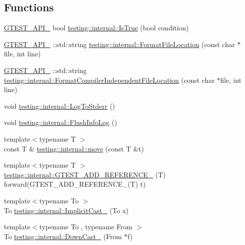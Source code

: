 \subsection*{Functions}
\begin{DoxyCompactItemize}
\item 
\mbox{\hyperlink{gtest-port_8h_aa73be6f0ba4a7456180a94904ce17790}{G\+T\+E\+S\+T\+\_\+\+A\+P\+I\+\_\+}} bool \mbox{\hyperlink{namespacetesting_1_1internal_a527b9bcc13669b9a16400c8514266254}{testing\+::internal\+::\+Is\+True}} (bool condition)
\item 
\mbox{\hyperlink{gtest-port_8h_aa73be6f0ba4a7456180a94904ce17790}{G\+T\+E\+S\+T\+\_\+\+A\+P\+I\+\_\+}} \+::std\+::string \mbox{\hyperlink{namespacetesting_1_1internal_a31b7c3abed4a7c395f42c61e993989f4}{testing\+::internal\+::\+Format\+File\+Location}} (const char $\ast$file, int line)
\item 
\mbox{\hyperlink{gtest-port_8h_aa73be6f0ba4a7456180a94904ce17790}{G\+T\+E\+S\+T\+\_\+\+A\+P\+I\+\_\+}} \+::std\+::string \mbox{\hyperlink{namespacetesting_1_1internal_a1ee4cde97868c53e442d3182496a9f3c}{testing\+::internal\+::\+Format\+Compiler\+Independent\+File\+Location}} (const char $\ast$file, int line)
\item 
void \mbox{\hyperlink{namespacetesting_1_1internal_a06b1b20029fbd1dbeb59752f914fab84}{testing\+::internal\+::\+Log\+To\+Stderr}} ()
\item 
void \mbox{\hyperlink{namespacetesting_1_1internal_a2135f223bf6b527729aeaa651115183b}{testing\+::internal\+::\+Flush\+Info\+Log}} ()
\item 
{\footnotesize template$<$typename T $>$ }\\const T \& \mbox{\hyperlink{namespacetesting_1_1internal_a0f6d06bf8c3093b9c22bb08723db201e}{testing\+::internal\+::move}} (const T \&t)
\item 
{\footnotesize template$<$typename T $>$ }\\\mbox{\hyperlink{namespacetesting_1_1internal_a3b78178c942d020bb164d80d8c778bff}{testing\+::internal\+::\+G\+T\+E\+S\+T\+\_\+\+A\+D\+D\+\_\+\+R\+E\+F\+E\+R\+E\+N\+C\+E\+\_\+}} (T) forward(G\+T\+E\+S\+T\+\_\+\+A\+D\+D\+\_\+\+R\+E\+F\+E\+R\+E\+N\+C\+E\+\_\+(T) t)
\item 
{\footnotesize template$<$typename To $>$ }\\To \mbox{\hyperlink{namespacetesting_1_1internal_a982df3f369643b175f79cda4048bc3b9}{testing\+::internal\+::\+Implicit\+Cast\+\_\+}} (To x)
\item 
{\footnotesize template$<$typename To , typename From $>$ }\\To \mbox{\hyperlink{namespacetesting_1_1internal_a1a1a1aed3fe00908b8a45d5ab4a33665}{testing\+::internal\+::\+Down\+Cast\+\_\+}} (From $\ast$f)

\end{DoxyCompactItemize}
